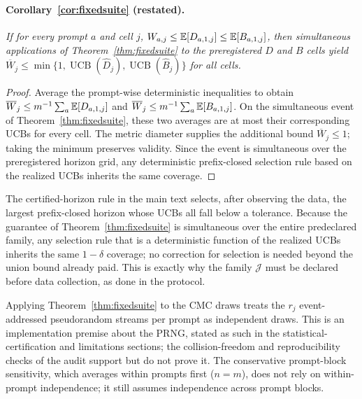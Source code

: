 \paragraph{Corollary~\ref{cor:fixedsuite} (restated).}
\emph{If for every prompt $a$ and cell $j$,
$W_{a,j}\le\mathbb{E}[D_{a,1,j}]\le\mathbb{E}[B_{a,1,j}]$, then simultaneous applications of
Theorem~\ref{thm:fixedsuite} to the preregistered $D$ and $B$ cells yield
$\overline W_j\le\min\{1,\operatorname{UCB}(\widehat D_j),
\operatorname{UCB}(\widehat B_j)\}$ for all cells.}

\begin{proof}
Average the prompt-wise deterministic inequalities to obtain
$\overline W_j\le m^{-1}\sum_a\mathbb{E}[D_{a,1,j}]$ and
$\overline W_j\le m^{-1}\sum_a\mathbb{E}[B_{a,1,j}]$. On the simultaneous event of
Theorem~\ref{thm:fixedsuite}, these two averages are at most their corresponding UCBs for every
cell. The metric diameter supplies the additional bound $\overline W_j\le1$; taking the minimum
preserves validity. Since the event is simultaneous over the preregistered horizon grid, any
deterministic prefix-closed selection rule based on the realized UCBs inherits the same coverage.
\end{proof}

\begin{remark}
\label{rem:G:posthoc}
The certified-horizon rule in the main text selects, after observing the data, the largest
prefix-closed horizon whose UCBs all fall below a tolerance. Because the guarantee of
Theorem~\ref{thm:fixedsuite} is simultaneous over the entire predeclared family, any selection rule that is a
deterministic function of the realized UCBs inherits the same $1-\delta$ coverage; no correction
for selection is needed beyond the union bound already paid. This is exactly why the family
$\mathcal{J}$ must be declared before data collection, as done in the protocol.
\end{remark}

\begin{remark}
\label{rem:G:indep}
Applying Theorem~\ref{thm:fixedsuite} to the CMC draws treats the $r_{j}$ event-addressed pseudorandom streams per
prompt as independent draws. This is an implementation premise about the PRNG, stated as such in
the statistical-certification and limitations sections; the collision-freedom and reproducibility checks of the audit support but do
not prove it. The conservative prompt-block sensitivity, which averages within prompts first ($n=m$), does not rely on within-prompt independence; it still assumes independence across prompt blocks.
\end{remark}

